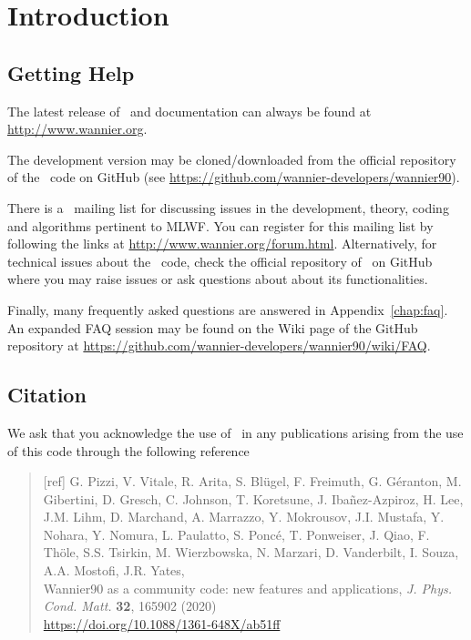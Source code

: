 \chapter*{Introduction}
\section*{Getting Help}
The latest release of \wannier\ and documentation can always
be found at \url{http://www.wannier.org}.

The development version may be cloned/downloaded from the
official repository of the \wannier\ code on GitHub
(see \url{https://github.com/wannier-developers/wannier90}).

There is a \wannier\ mailing list for discussing issues in the
development, theory, coding and algorithms pertinent to MLWF.
You can register for this mailing list by following the links at
\url{http://www.wannier.org/forum.html}.
Alternatively, for technical issues about the \wannier\ code,
check the official repository of \wannier\ on GitHub
where you may raise issues or ask questions about about its
functionalities.

Finally, many frequently asked questions are answered in
Appendix~\ref{chap:faq}. An expanded FAQ session may be
found on the Wiki page of the GitHub repository at
\url{https://github.com/wannier-developers/wannier90/wiki/FAQ}.

\section*{Citation}
We ask that you acknowledge the use of \wannier\ in any publications
arising from the use of this code through the following reference
\begin{quote}
  [ref] G. Pizzi, V. Vitale, R. Arita, S. Bl\"ugel, F. Freimuth, G. G\'eranton,
  M. Gibertini, D. Gresch, C. Johnson, T. Koretsune, J. Iba\~nez-Azpiroz,
  H. Lee, J.M. Lihm, D. Marchand, A. Marrazzo, Y. Mokrousov, J.I. Mustafa,
  Y. Nohara, Y. Nomura, L. Paulatto, S. Ponc\'e, T. Ponweiser, J. Qiao,
  F. Th\"ole, S.S. Tsirkin, M. Wierzbowska, N. Marzari, D. Vanderbilt,
  I. Souza, A.A. Mostofi, J.R. Yates,\\
  Wannier90 as a community code: new features and
    applications, \emph{J. Phys. Cond. Matt.} {\bf 32}, 165902 (2020)\\
    \url{https://doi.org/10.1088/1361-648X/ab51ff}
  \end{quote}

